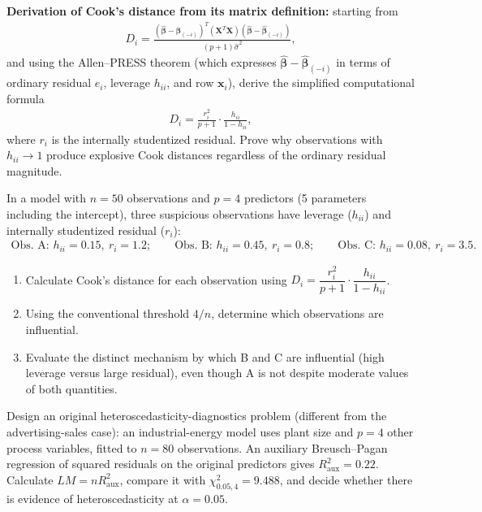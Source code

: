 \begin{problema}
\label{prob:269eee0}
\textbf{Derivation of Cook's distance from its matrix definition:} starting from
\begin{align}
D_i=\frac{(\hat{\boldsymbol\beta}-\hat{\boldsymbol\beta}_{(-i)})^T(\mathbf X^T\mathbf X)(\hat{\boldsymbol\beta}-\hat{\boldsymbol\beta}_{(-i)})}{(p+1)\hat\sigma^2},
\end{align}
and using the Allen--PRESS theorem (which expresses $\hat{\boldsymbol\beta}-\hat{\boldsymbol\beta}_{(-i)}$ in terms of ordinary residual $e_i$, leverage $h_{ii}$, and row $\mathbf x_i$), derive the simplified computational formula
\begin{align}
D_i=\frac{r_i^2}{p+1}\cdot\frac{h_{ii}}{1-h_{ii}},
\end{align}
where $r_i$ is the internally studentized residual. Prove why observations with $h_{ii}\to1$ produce explosive Cook distances regardless of the ordinary residual magnitude.
\end{problema}

\begin{problema}
\label{prob:dc2ca7b}
In a model with $n=50$ observations and $p=4$ predictors (5 parameters including the intercept), three suspicious observations have leverage ($h_{ii}$) and internally studentized residual ($r_i$):
\begin{align}
\text{Obs. A: }h_{ii}=0.15,\ r_i=1.2;\qquad \text{Obs. B: }h_{ii}=0.45,\ r_i=0.8;\qquad \text{Obs. C: }h_{ii}=0.08,\ r_i=3.5.
\end{align}
\begin{enumerate}
\item Calculate Cook's distance for each observation using $D_i=\dfrac{r_i^2}{p+1}\cdot\dfrac{h_{ii}}{1-h_{ii}}$.
\item Using the conventional threshold $4/n$, determine which observations are influential.
\item Evaluate the distinct mechanism by which B and C are influential (high leverage versus large residual), even though A is not despite moderate values of both quantities.
\end{enumerate}
\end{problema}

\begin{problema}
\label{prob:f0b580a}
Design an original heteroscedasticity-diagnostics problem (different from the advertising-sales case): an industrial-energy model uses plant size and $p=4$ other process variables, fitted to $n=80$ observations. An auxiliary Breusch--Pagan regression of squared residuals on the original predictors gives $R_{\text{aux}}^2=0.22$. Calculate $LM=nR_{\text{aux}}^2$, compare it with $\chi^2_{0.05,4}=9.488$, and decide whether there is evidence of heteroscedasticity at $\alpha=0.05$.
\end{problema}

